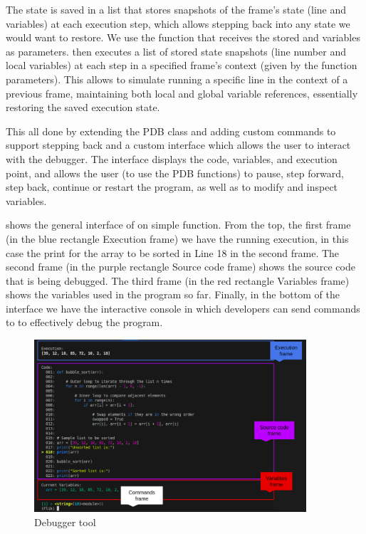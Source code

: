 The state is saved in a list that stores snapshots of the frame's state (line and variables) at each 
execution step, which allows stepping back into any state we would want to restore. We use the  
 function that receives the stored  and  variables as 
parameters.  then executes a list of stored state snapshots (line number 
and local variables) at each step in a specified frame's context (given by the function parameters). 
This allows \flik to simulate running a specific line in the context of a previous frame, maintaining 
both local and global variable references, essentially restoring the saved execution state.

This all done by extending the \ac{PDB} class and adding custom commands to support stepping 
back and a custom interface which allows the user to interact with the debugger. The interface 
displays the code, variables, and execution point, and allows the user (to use the \ac{PDB} 
functions) to pause, step forward, step back, continue or restart the program, as well as to 
modify and inspect variables. 

 shows the general interface of \flik on simple  function. From 
the top, the first frame (in the blue rectangle Execution frame) we have the running execution, in this 
case the print for the array to be sorted in Line 18 in the second frame. The second frame (in the 
purple rectangle Source code frame) shows the source code that is being debugged. The third frame 
(in the red rectangle Variables frame) shows the variables used in the program so far. Finally, in the 
bottom of the interface we have the interactive console in which developers can send commands to 
\flik to effectively debug the program.

\begin{figure}[h]
    \centering
    \includegraphics[width=0.9\textwidth]{figures/flik_interface.png}
    \caption{Debugger tool}
    \label{fig:debuggerf}
\end{figure}

